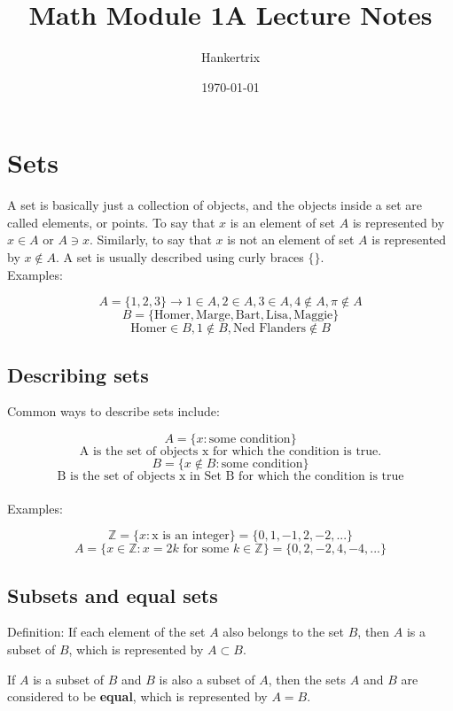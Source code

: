\documentclass[11pt]{article}
\author{Hankertrix}
\date{\today}
\title{Math Module 1A Lecture Notes}
\begin{document}
\maketitle
\setcounter{tocdepth}{2}
\tableofcontents

\newpage


\section{Sets}
\label{sec:org2925294}
A set is basically just a collection of objects, and the objects inside a set are called elements, or points. To say that \(x\) is an element of set \(A\) is represented by \(x \in A\) or \(A \ni x\). Similarly, to say that \(x\) is not an element of set \(A\) is represented by \(x \notin A\). A set is usually described using curly braces \(\{\}\).
\\[0pt]

Examples:

\[A = \{1,2,3\} \rightarrow 1 \in A, 2 \in A, 3 \in A, 4 \notin A, \pi \notin A\]
\[B = \{\text{Homer}, \text{Marge}, \text{Bart}, \text{Lisa}, \text{Maggie}\}\]
\[\text{Homer}\in B, 1 \notin B, \text{Ned Flanders} \notin B\]


\subsection{Describing sets}
\label{sec:orgcb4e38c}

Common ways to describe sets include:

\[A = \{x: \text{some condition}\}\]
\[\text{A is the set of objects x for which the condition is true.}\]
\[B = \{x \notin B: \text{some condition}\}\]
\[\text{B is the set of objects x in Set B for which the condition is true}\]
\\[0pt]
Examples:

\[\mathbb{Z} = \{x: \text{x is an integer}\} = \{0, 1, -1, 2, -2, ...\}\]
\[A = \{x \in \mathbb{Z}: x = 2k \text{ for some } k \in \mathbb{Z}\} = \{0, 2, -2, 4, -4, ...\}\]

\subsection{Subsets and equal sets}
\label{sec:orgf693be2}
Definition: If each element of the set \(A\) also belongs to the set \(B\), then \(A\) is a subset of \(B\), which is represented by \(A \subset B\).

If \(A\) is a subset of \(B\) and \(B\) is also a subset of \(A\), then the sets \(A\) and \(B\) are considered to be \textbf{equal}, which is represented by \(A = B\).
\end{document}
